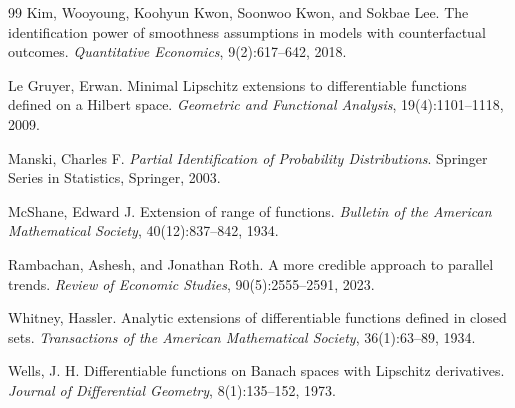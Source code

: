 \documentclass[11pt]{article}
\theoremstyle{definition}
\theoremstyle{plain}
\theoremstyle{remark}
\begin{document}
\begin{thebibliography}{99}
Kim, Wooyoung, Koohyun Kwon, Soonwoo Kwon, and Sokbae Lee.
\newblock The identification power of smoothness assumptions in models with counterfactual outcomes.
\newblock \emph{Quantitative Economics}, 9(2):617--642, 2018.

Le Gruyer, Erwan.
\newblock Minimal Lipschitz extensions to differentiable functions defined on a Hilbert space.
\newblock \emph{Geometric and Functional Analysis}, 19(4):1101--1118, 2009.

Manski, Charles F.
\newblock \emph{Partial Identification of Probability Distributions}.
\newblock Springer Series in Statistics, Springer, 2003.

McShane, Edward J.
\newblock Extension of range of functions.
\newblock \emph{Bulletin of the American Mathematical Society}, 40(12):837--842, 1934.

Rambachan, Ashesh, and Jonathan Roth.
\newblock A more credible approach to parallel trends.
\newblock \emph{Review of Economic Studies}, 90(5):2555--2591, 2023.

Whitney, Hassler.
\newblock Analytic extensions of differentiable functions defined in closed sets.
\newblock \emph{Transactions of the American Mathematical Society}, 36(1):63--89, 1934.

Wells, J. H.
\newblock Differentiable functions on Banach spaces with Lipschitz derivatives.
\newblock \emph{Journal of Differential Geometry}, 8(1):135--152, 1973.
\end{thebibliography}
\end{document}
